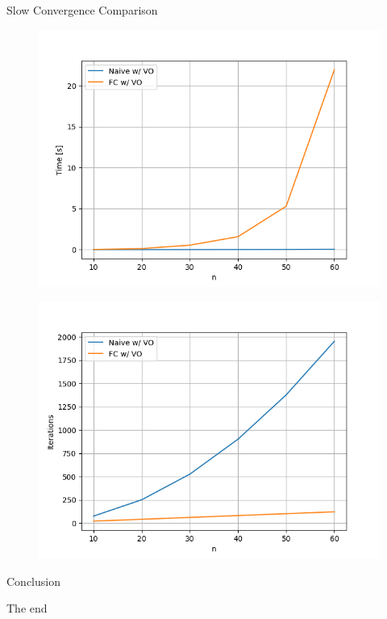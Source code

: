 \documentclass[mathserif,table]{gkibeamer-aaai}
\begin{document}
\begin{frame}{Slow Convergence Comparison}
	\begin{multicols}{2}
		\begin{figure}[ht]
			\includegraphics[scale=0.35]{./figures/plots/slow/time.png}
		\end{figure}
		\columnbreak
		\begin{figure}[ht]
			\includegraphics[scale=0.35]{./figures/plots/slow/iterations.png}
		\end{figure}
	\end{multicols}
\end{frame}

\begin{frame}
\end{frame}

\begin{frame}
	\begin{center}
		\huge{Conclusion}
	\end{center}
\end{frame}

\begin{frame}
	\begin{center}
		\huge{The end}
	\end{center}
\end{frame}
\end{document}
